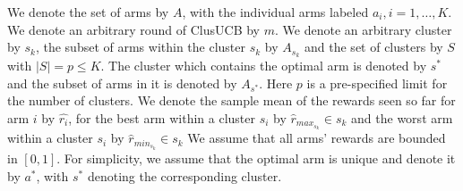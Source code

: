 We denote the set of arms by $A$, with the individual arms labeled $a_i, i=1,\ldots,K$.
We denote an arbitrary round of ClusUCB by $m$. We denote an arbitrary cluster by $s_{k}$, the subset of arms within the cluster $s_k$ by  $A_{s_{k}}$  and the set of clusters by $S$ with $|S|=p\leq K$. The cluster which contains the optimal arm is denoted by $s^{*}$ and the subset of arms in it is denoted by $A_{s^{*}}$. Here $p$ is a pre-specified limit for the number of clusters. 
We denote the sample mean of the rewards seen so far for arm $i$ by $\hat{r_i}$, for the best arm within a cluster $s_i$ by $\hat{r}_{max_{s_{k}}}\in s_{k}$ and the worst arm within a cluster $s_i$ by $\hat{r}_{min_{s_{k}}}\in s_{k}$ 
We assume that all arms' rewards are bounded in $[0,1]$. For simplicity, we assume that the optimal arm is unique and denote it by $a^{*}$, with $s^{*}$ denoting the corresponding cluster.
